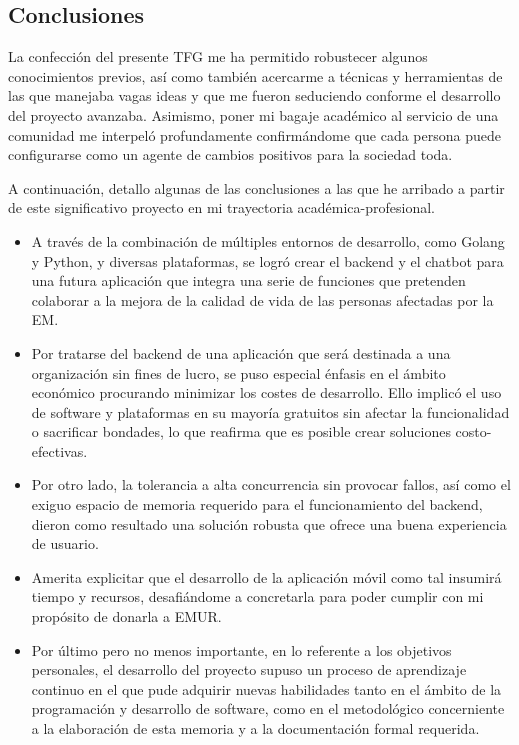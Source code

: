 

\subsection{Conclusiones}
La confección del presente TFG me ha permitido robustecer algunos conocimientos previos, así como también acercarme a técnicas y herramientas de las que manejaba vagas ideas y que me fueron seduciendo conforme el desarrollo del proyecto avanzaba. Asimismo, poner mi bagaje académico al servicio de una comunidad me interpeló profundamente confirmándome que cada persona puede configurarse como un agente de cambios positivos para la sociedad toda.

A continuación, detallo algunas de las conclusiones a las que he arribado a partir de este significativo proyecto en mi trayectoria académica-profesional.

\begin{itemize}
\item A través de la combinación de múltiples entornos de desarrollo, como Golang y Python, y diversas plataformas, se logró crear el backend y el chatbot para una futura aplicación que integra una serie de funciones que pretenden colaborar a la mejora de la calidad de vida de las personas afectadas por la EM.

\item Por tratarse del backend de una aplicación que será destinada a una organización sin fines de lucro, se puso especial énfasis en el ámbito económico procurando minimizar los costes de desarrollo. Ello implicó el uso de software y plataformas en su mayoría gratuitos sin afectar la funcionalidad o sacrificar bondades, lo que reafirma que es posible crear soluciones costo-efectivas.

\item Por otro lado, la tolerancia a alta concurrencia sin provocar fallos, así como el exiguo espacio de memoria requerido para el funcionamiento del backend, dieron como resultado una solución robusta que ofrece una buena experiencia de usuario.

\item Amerita explicitar que el desarrollo de la aplicación móvil como tal insumirá tiempo y recursos, desafiándome a concretarla para poder cumplir con mi propósito de donarla a EMUR.

\item Por último pero no menos importante, en lo referente a los objetivos personales, el desarrollo del proyecto supuso un proceso de aprendizaje continuo en el que pude adquirir nuevas habilidades tanto en el ámbito de la programación y desarrollo de software, como en el metodológico concerniente a la elaboración de esta memoria y a la documentación formal requerida.

\end{itemize}


